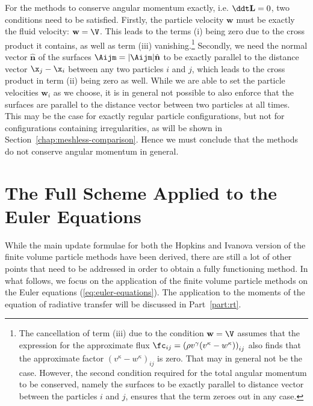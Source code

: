 For the methods to conserve angular momentum exactly, i.e. $\ddt \mathbf{L} = 0$, two conditions
need to be satisfied. Firstly, the particle velocity $\mathbf{w}$ must be exactly the fluid
velocity: $\mathbf{w} = \V$. This leads to the terms (i) being zero due to the cross product it
contains, as well as term (iii) vanishing.\footnote{
The cancellation of term (iii) due to the condition $\mathbf{w} = \V$ assumes that the expression
for the approximate flux $\fc_{ij} = \left( \rho v^\gamma  (v^\kappa - w^\kappa) \right)_{ij}$
also finds that the approximate factor $(v^\kappa - w^\kappa)_{ij}$ is zero.
That may in general not be the case. However, the second condition required for the total angular
momentum to be conserved, namely the surfaces \Aij to be exactly parallel to distance vector between the particles $i$ and $j$, ensures that the term zeroes out in any case.
}
Secondly, we need the normal vector $\hat{\mathbf{n}}$ of the surfaces $\Aijm =
|\Aijm|\hat{\mathbf{n}}$ to be exactly parallel to the distance vector $\x_j - \x_i$ between any
two particles $i$ and $j$, which leads to the cross product in term (ii) being zero as well. While
we are able to set the particle velocities $\mathbf{w}_i$ as we choose, it is in general not
possible to also enforce that the surfaces are parallel to the distance vector between two particles at all times. This may be the case for exactly regular particle configurations, but not for configurations containing irregularities, as will be shown in
Section~\ref{chap:meshless-comparison}. Hence we must conclude that the methods do not conserve
angular momentum in general.












\section{The Full Scheme Applied to the Euler Equations}\label{chap:meshless-full}


While the main update formulae for both the Hopkins and Ivanova version of the finite volume
particle methods have been derived, there are still a lot of other points that need to be addressed
in order to obtain a fully functioning method. In what follows, we focus on the application of the
finite volume particle methods on the Euler equations (\ref{eq:euler-equations}). The application
to the moments of the equation of radiative transfer will be discussed in Part~\ref{part:rt}.

